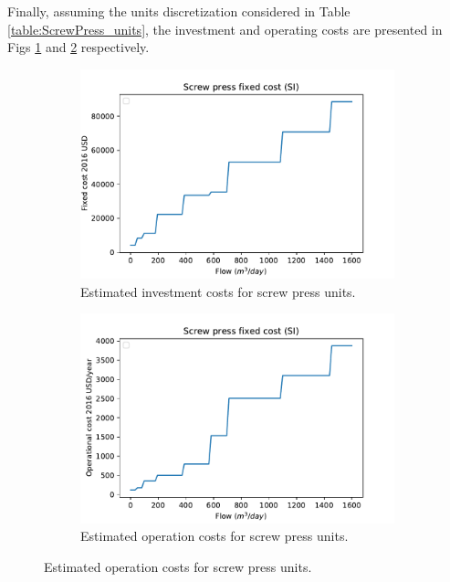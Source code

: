 \documentclass[10pt,a4paper]{article}
\begin{document}
Finally, assuming the units discretization considered in Table \ref{table:ScrewPress_units}, the investment and operating costs are presented in Figs \ref{fig:screwpress_unit_cost_m} and \ref{fig:screwpress_op_cost_m} respectively.
\begin{figure}[H]
	\begin{subfigure}[t]{0.5\linewidth}
		\includegraphics[width=\linewidth]{screwpress_unit_cost_m} 
		\caption{Estimated investment costs for screw press units.}
		\label{fig:screwpress_unit_cost_m}
	\end{subfigure}
	\quad
	\begin{subfigure}[t]{0.5\linewidth}
		\includegraphics[width=\linewidth]{screwpress_op_cost_m}
		\caption{Estimated operation costs for screw press units.}
		\label{fig:screwpress_op_cost_m}
	\end{subfigure}
	
	\label{fig:screwpress_costs}
\end{figure}
\end{document}
